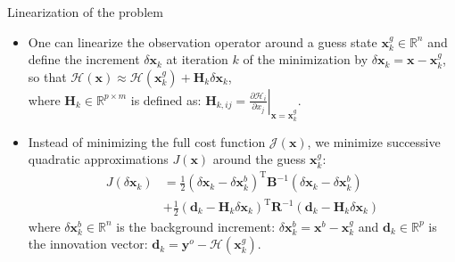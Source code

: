 \documentclass[10pt]{beamer}
\begin{document}
\begin{frame}{Linearization of the problem}
\begin{itemize}
\item One can linearize the observation operator around a guess state $\mathbf{x}^g_k \in \mathbb{R}^n$ and define the increment $\delta \mathbf{x}_k$ at iteration $k$ of the minimization by $\delta \mathbf{x}_k =  \mathbf{x}-\mathbf{x}^g_k$, so that
$\mathcal{H}(\mathbf{x}) \approx \mathcal{H}(\mathbf{x}^g_k) + \mathbf{H}_k \delta \mathbf{x}_k$,\\
where $\mathbf{H}_k \in \mathbb{R}^{p \times m}$ is defined as: $\mathbf{H}_{k,ij} = \left.\frac{\partial \mathcal{H}_i}{\partial x_j}\right|_{\mathbf{x} = \mathbf{x}^g_k}$.

\item Instead of minimizing the full cost function $\mathcal{J}(\mathbf{x})$, we minimize successive quadratic approximations $J(\mathbf{x})$ around the guess $\mathbf{x}^g_k$:
\begin{align}
J \left(\delta \mathbf{x}_k\right) & = \frac{1}{2} \left(\delta \mathbf{x}_k-\delta \mathbf{x}^b_k\right)^\mathrm{T} \mathbf{B}^{-1} \left(\delta \mathbf{x}_k-\delta \mathbf{x}^b_k\right) \nonumber \\
& + \frac{1}{2} \left(\mathbf{d}_k - \mathbf{H}_k \delta \mathbf{x}_k\right)^\mathrm{T} \mathbf{R}^{-1} \left(\mathbf{d}_k - \mathbf{H}_k \delta \mathbf{x}_k\right)
\end{align}
where $\delta \mathbf{x}^b_k  \in \mathbb{R}^n$ is the background increment: $\delta \mathbf{x}^b_k = \mathbf{x}^b - \mathbf{x}^g_k$ and $\mathbf{d}_k \in \mathbb{R}^p$ is the innovation vector: $\mathbf{d}_k = \mathbf{y}^o - \mathcal{H}(\mathbf{x}^g_k)$.
\end{itemize}
\end{frame}
\end{document}
